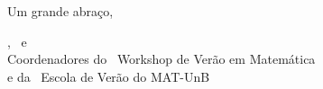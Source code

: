 Um grande abra\c{c}o,

\vspace{24pt}

\begin{center}
	\coordgeral, \coordgerali\ e \coordgeralii\\ 
	Coordenadores do \edworkshop\ Workshop de Ver\~{a}o em Matem\'{a}tica\\
	e da \edverao\ Escola de Ver\~{a}o do MAT-UnB
\end{center}



\restoregeometry